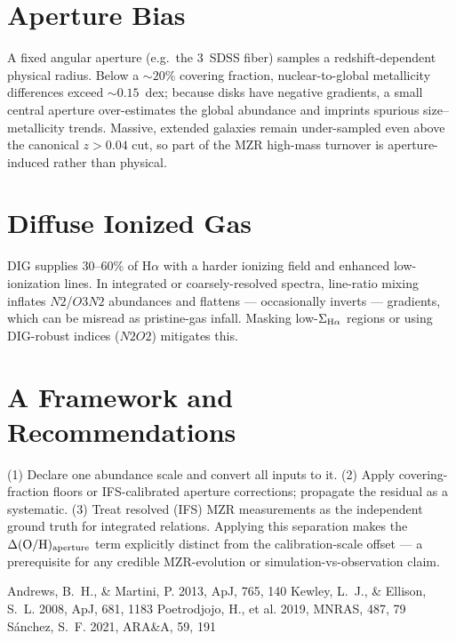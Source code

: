 \documentclass[twocolumn]{aastex631}
\begin{document}
\section{Aperture Bias}
A fixed angular aperture (e.g.\ the 3\arcsec\ SDSS fiber) samples a redshift-dependent physical radius.
Below a $\sim20\%$ covering fraction, nuclear-to-global metallicity differences exceed $\sim0.15$~dex;
because disks have negative gradients, a small central aperture over-estimates the global abundance and
imprints spurious size--metallicity trends. Massive, extended galaxies remain under-sampled even above the
canonical $z>0.04$ cut, so part of the MZR high-mass turnover is aperture-induced rather than physical.

\section{Diffuse Ionized Gas}
DIG supplies 30--60\% of H$\alpha$ with a harder ionizing field and enhanced low-ionization lines. In
integrated or coarsely-resolved spectra, line-ratio mixing inflates $N2$/$O3N2$ abundances and flattens
--- occasionally inverts --- gradients, which can be misread as pristine-gas infall. Masking
low-$\Sigma_{{\rm H}\alpha}$ regions or using DIG-robust indices ($N2O2$) mitigates this.

\section{A Framework and Recommendations}
(1) Declare one abundance scale and convert all inputs to it. (2) Apply covering-fraction floors or
IFS-calibrated aperture corrections; propagate the residual as a systematic. (3) Treat resolved (IFS) MZR
measurements as the independent ground truth for integrated relations. Applying this separation makes the
$\Delta({\rm O/H})_{\rm aperture}$ term explicitly distinct from the calibration-scale offset --- a
prerequisite for any credible MZR-evolution or simulation-vs-observation claim.

\begin{thebibliography}{}
 Andrews, B.~H., \& Martini, P. 2013, ApJ, 765, 140
 Kewley, L.~J., \& Ellison, S.~L. 2008, ApJ, 681, 1183
 Poetrodjojo, H., et al. 2019, MNRAS, 487, 79
 S{\'a}nchez, S.~F. 2021, ARA\&A, 59, 191
\end{thebibliography}
\end{document}
